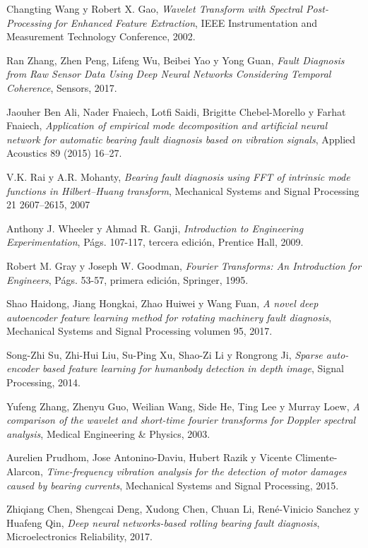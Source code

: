 \documentclass[12pt]{article}%
\begin{document}
\begin{thebibliography}{9}
Changting Wang y Robert X. Gao, \textit{Wavelet Transform with Spectral Post-Processing for
Enhanced Feature Extraction}, IEEE Instrumentation and Measurement Technology Conference, 2002.

Ran Zhang, Zhen Peng, Lifeng Wu, Beibei Yao y Yong Guan, \textit{Fault Diagnosis from Raw Sensor Data Using Deep Neural Networks Considering Temporal Coherence}, Sensors, 2017.

Jaouher Ben Ali, Nader Fnaiech, Lotfi Saidi, Brigitte Chebel-Morello y Farhat Fnaiech, \textit{Application of empirical mode decomposition and artificial neural network for automatic bearing fault diagnosis based on vibration signals}, Applied Acoustics 89 (2015) 16–27.

V.K. Rai y A.R. Mohanty, \textit{Bearing fault diagnosis using FFT of intrinsic mode functions in Hilbert–Huang transform}, Mechanical Systems and Signal Processing 21 2607–2615, 2007

Anthony J. Wheeler y Ahmad R. Ganji, \textit{Introduction to Engineering Experimentation}, Págs. 107-117, tercera edición, Prentice Hall, 2009.

Robert M. Gray y Joseph W. Goodman, \textit{Fourier Transforms: An Introduction for Engineers}, Págs. 53-57, primera edición, Springer, 1995.

Shao Haidong, Jiang Hongkai, Zhao Huiwei y Wang Fuan, \textit{A novel deep autoencoder feature learning method for rotating machinery fault diagnosis}, Mechanical Systems and Signal Processing volumen 95, 2017. 

Song-Zhi Su, Zhi-Hui Liu, Su-Ping Xu, Shao-Zi Li y Rongrong Ji, \textit{Sparse auto-encoder based feature learning for humanbody detection in depth image}, Signal Processing, 2014.

Yufeng Zhang, Zhenyu Guo, Weilian Wang, Side He, Ting Lee y Murray Loew, \textit{A comparison of the wavelet and short-time fourier transforms for Doppler spectral analysis}, Medical Engineering \& Physics, 2003.



Aurelien Prudhom, Jose Antonino-Daviu, Hubert Razik y Vicente Climente-Alarcon, \textit{Time-frequency vibration analysis for the detection of motor damages caused by bearing currents}, Mechanical Systems and Signal Processing, 2015.

Zhiqiang Chen, Shengcai Deng, Xudong Chen, Chuan Li, René-Vinicio Sanchez y Huafeng Qin, \textit{Deep neural networks-based rolling bearing fault diagnosis}, Microelectronics Reliability, 2017.


\end{thebibliography}
\end{document}
